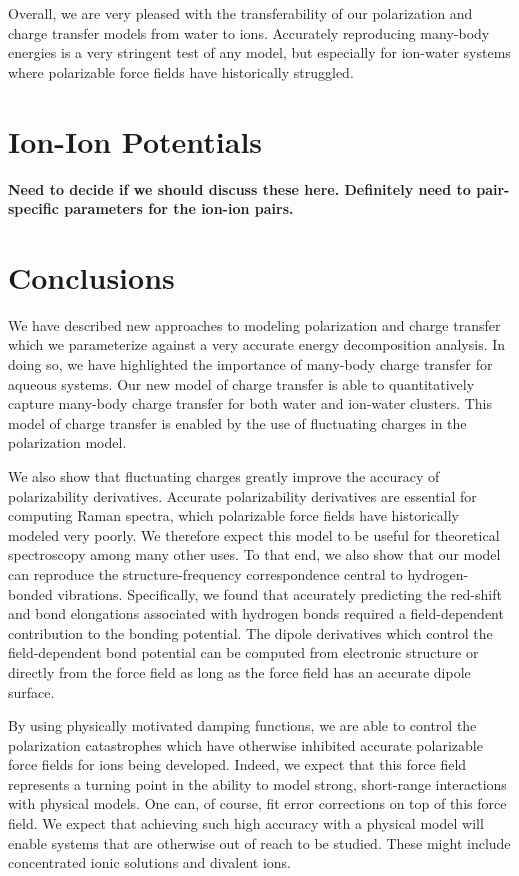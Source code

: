 \documentclass[journal=jacsat,manuscript=article]{achemso}
\begin{document}
Overall, we are very pleased with the transferability of our polarization and charge transfer models
from water to ions. Accurately reproducing many-body energies is a very stringent test of
any model, but especially for ion-water systems where polarizable force fields have
historically struggled.

\section*{Ion-Ion Potentials}

\textbf{Need to decide if we should discuss these here. Definitely need to pair-specific parameters
for the ion-ion pairs.}

\section*{Conclusions}

We have described new approaches to modeling polarization and charge transfer which
we parameterize against a very accurate energy decomposition analysis. In doing so,
we have highlighted the importance of many-body charge transfer for aqueous systems.
Our new model of charge transfer is able to quantitatively capture many-body charge
transfer for both water and ion-water clusters. This model of charge transfer is
enabled by the use of fluctuating charges in the polarization model.

We also show that fluctuating charges greatly improve the accuracy of polarizability
derivatives. Accurate polarizability derivatives are essential for computing Raman
spectra, which polarizable force fields have historically modeled very poorly. We
therefore expect this model to be useful for theoretical spectroscopy among many other
uses. To that end, we also show that our model can reproduce the structure-frequency
correspondence central to hydrogen-bonded vibrations. Specifically, we found that
accurately predicting the red-shift and bond elongations associated with hydrogen bonds
required a field-dependent contribution to the bonding potential. The dipole derivatives
which control the field-dependent bond potential can be computed from electronic structure
or directly from the force field as long as the force field has an accurate dipole surface.

By using physically motivated damping functions, we are able to control the polarization
catastrophes which have otherwise inhibited accurate polarizable force fields for ions
being developed. Indeed, we expect that this force field represents a turning point in
the ability to model strong, short-range interactions with physical models. One can, of course,
fit error corrections on top of this force field. We expect that achieving such high
accuracy with a physical model will enable systems that are otherwise out of reach to be studied.
These might include concentrated ionic solutions and divalent ions.
\end{document}
